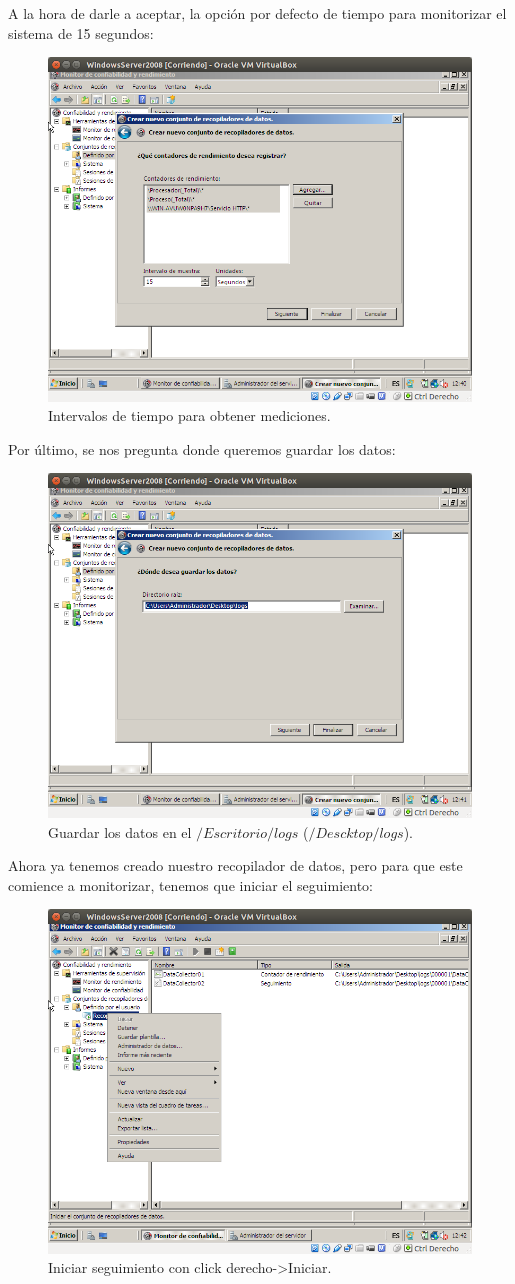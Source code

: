 \begin{itemize}
		A la hora de darle a aceptar, la opción por defecto de tiempo para monitorizar el sistema de 15 segundos:\\
		\begin{figure}[H]
		\centering
		\includegraphics[width=0.6\linewidth]{Intervalo15seg}
		\caption[intervalos]{Intervalos de tiempo para obtener mediciones.}
		\label{fig:Intervalo15seg}
		\end{figure}
		Por último, se nos pregunta donde queremos guardar los datos:\\
		\begin{figure}[H]
		\centering
		\includegraphics[width=0.6\linewidth]{EscritorioLogs}
		\caption[GuardarDatos]{Guardar los datos en el $/Escritorio/logs$ ($/Descktop/logs$).}
		\label{fig:EscritorioLogs}
		\end{figure}
		
		Ahora ya tenemos creado nuestro recopilador de datos, pero para que este comience a monitorizar, tenemos que iniciar el seguimiento:\\
		\begin{figure}[H]
		\centering
		\includegraphics[width=0.6\linewidth]{seguimiento}
		\caption[Seguimiento]{Iniciar seguimiento con click derecho->Iniciar.}
		\label{fig:seguimiento}
		\end{figure}
		

\end{itemize}
